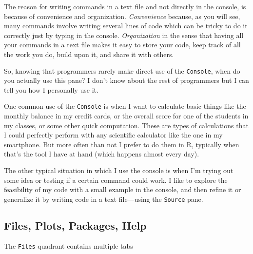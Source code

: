 \documentclass[
]{book}
\begin{document}
The reason for writing commands in a text file and not directly in the console,
is because of convenience and organization. \emph{Convenience} because, as you will
see, many commands involve writing several lines of code which can be tricky to
do it correctly just by typing in the console. \emph{Organization} in the sense that
having all your commands in a text file makes it easy to store your code,
keep track of all the work you do, build upon it, and share it with others.

So, knowing that programmers rarely make direct use of the \texttt{Console}, when
do you actually use this pane? I don't know about the rest of programmers but
I can tell you how I personally use it.

One common use of the \texttt{Console} is when I want to calculate basic things like
the monthly balance in my credit cards, or the overall score for one of the
students in my classes, or some other quick computation. These are types of
calculations that I could perfectly perform with any scientific calculator
like the one in my smartphone. But more often than not I prefer to do them in R,
typically when that's the tool I have at hand (which happens almost every day).

The other typical situation in which I use the console is when I'm trying out
some idea or testing if a certain command could work. I like to explore the
feasibility of my code with a small example in the console, and then refine it
or generalize it by writing code in a text file---using the \texttt{Source} pane.

\hypertarget{files-plots-packages-help}{%
\subsection{Files, Plots, Packages, Help}\label{files-plots-packages-help}}

The \texttt{Files} quadrant contains multiple tabs
\end{document}
